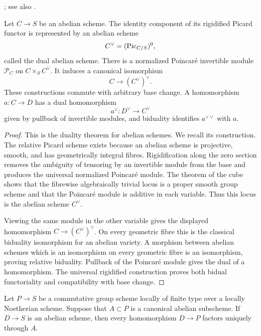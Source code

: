 \begin{theorem}
\label{theorem-dual-abelian-scheme}
\begin{reference}
\cite[Expos\'e 236, Theorem 3.3(iii), p. 238]{FGA};
see also \cite{AVar}.
\end{reference}
Let $C \to S$ be an abelian scheme. The identity component of its rigidified
Picard functor is represented by an abelian scheme
$$
C^\vee = (\mathrm{Pic}_{C/S})^0,
$$
called the dual abelian scheme. There is a normalized Poincar\'e invertible
module $\mathcal{P}_C$ on $C \times_S C^\vee$. It induces a canonical
isomorphism
$$
C \longrightarrow (C^\vee)^\vee.
$$
These constructions commute with arbitrary base change. A homomorphism
$a : C \to D$ has a dual homomorphism
$$
a^\vee : D^\vee \longrightarrow C^\vee
$$
given by pullback of invertible modules, and biduality identifies
$a^{\vee\vee}$ with $a$.
\end{theorem}

\begin{proof}
This is the duality theorem for abelian schemes. We recall its construction.
The relative Picard scheme exists because an abelian scheme is projective,
smooth, and has geometrically integral fibres. Rigidification along the zero
section removes the ambiguity of tensoring by an invertible module from the
base and produces the universal normalized Poincar\'e module. The theorem of
the cube shows that the fibrewise algebraically trivial locus is a proper
smooth group scheme and that the Poincar\'e module is additive in each
variable. Thus this locus is the abelian scheme $C^\vee$.

Viewing the same module in the other variable gives the displayed
homomorphism $C \to (C^\vee)^\vee$. On every geometric fibre this is the
classical biduality isomorphism for an abelian variety. A morphism between
abelian schemes which is an isomorphism on every geometric fibre is an
isomorphism, proving relative biduality. Pullback of the Poincar\'e module
gives the dual of a homomorphism. The universal rigidified construction proves
both bidual functoriality and compatibility with base change.
\end{proof}

\begin{lemma}
\label{lemma-abelian-map-factors-canonical-picard}
Let $P \to S$ be a commutative group scheme locally of finite type over a
locally Noetherian scheme. Suppose that $A \subset P$ is a canonical abelian
subscheme. If $D \to S$ is an abelian scheme, then every homomorphism
$D \to P$ factors uniquely through $A$.
\end{lemma}

